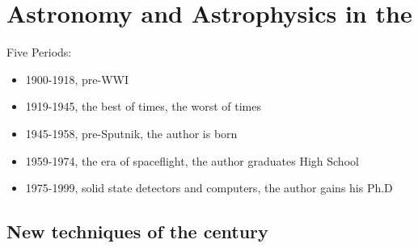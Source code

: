 \chapter{Astronomy and Astrophysics in the }

Five Periods:
\begin{itemize}
	\item 1900-1918, pre-WWI
	\item 1919-1945, the best of times, the worst of times
	\item 1945-1958, pre-Sputnik, the author is born
	\item 1959-1974, the era of spaceflight, the author graduates High School 
	\item 1975-1999, solid state detectors and computers, the author gains his Ph.D
\end{itemize}

\section{New techniques of the century}

